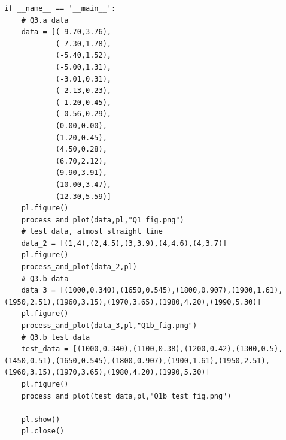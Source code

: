 \documentclass[a4paper,11pt]{article}
\begin{document}
{\begin{lstlisting}
if __name__ == '__main__':
    # Q3.a data
    data = [(-9.70,3.76),
            (-7.30,1.78),
            (-5.40,1.52),
            (-5.00,1.31),
            (-3.01,0.31),
            (-2.13,0.23),
            (-1.20,0.45),
            (-0.56,0.29),
            (0.00,0.00),
            (1.20,0.45),
            (4.50,0.28),
            (6.70,2.12),
            (9.90,3.91),
            (10.00,3.47),
            (12.30,5.59)]
    pl.figure()
    process_and_plot(data,pl,"Q1_fig.png") 
    # test data, almost straight line
    data_2 = [(1,4),(2,4.5),(3,3.9),(4,4.6),(4,3.7)]
    pl.figure()
    process_and_plot(data_2,pl)
    # Q3.b data
    data_3 = [(1000,0.340),(1650,0.545),(1800,0.907),(1900,1.61),(1950,2.51),(1960,3.15),(1970,3.65),(1980,4.20),(1990,5.30)]
    pl.figure()
    process_and_plot(data_3,pl,"Q1b_fig.png")
    # Q3.b test data
    test_data = [(1000,0.340),(1100,0.38),(1200,0.42),(1300,0.5),(1450,0.51),(1650,0.545),(1800,0.907),(1900,1.61),(1950,2.51),(1960,3.15),(1970,3.65),(1980,4.20),(1990,5.30)]
    pl.figure()
    process_and_plot(test_data,pl,"Q1b_test_fig.png")

    pl.show()
    pl.close()
\end{lstlisting}
}
\end{document}
